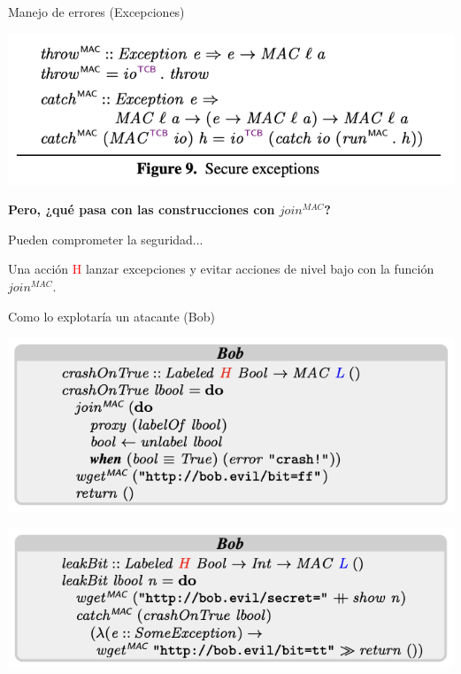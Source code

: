 \documentclass{beamer}
\begin{document}
\begin{frame}{Manejo de errores (Excepciones)}
    \begin{center}
        \includegraphics[scale=0.7]{figure9.png}
    \end{center}


    \textbf{Pero, ¿qué pasa con las construcciones con $join^{MAC}$?}
    
    Pueden comprometer la seguridad...
    
    Una acción \textcolor{red}{H} lanzar excepciones y evitar acciones de nivel bajo con la función $join^{MAC}$.
\end{frame}

\begin{frame}{Como lo explotaría un atacante (Bob)}

    \begin{center}
        \includegraphics[scale=0.7]{codigo_bob2.png}
    \end{center}

    \begin{center}
        \includegraphics[scale=0.7]{codigo_bob3.png}
    \end{center}
\end{frame}
\end{document}
